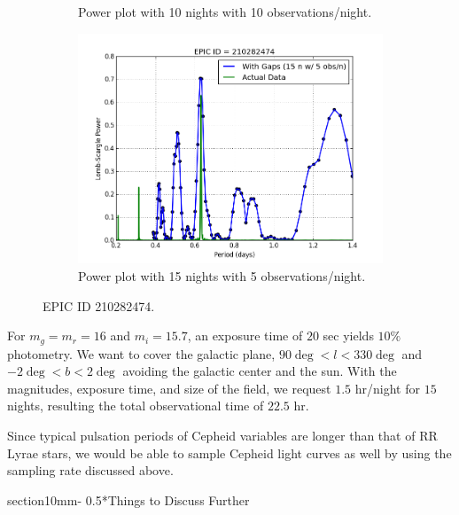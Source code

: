 \documentclass[letterpaper,11pt]{article}
\makeatletter
\renewcommand{\section}{\@startsection%
{section}{1}{0mm}{-\baselineskip}%
{0.5\baselineskip}{\normalfont\Large\bfseries}}%
\makeatother
\begin{document}
\begin{figure}[H]
\begin{subfigure}{.5\textwidth}
  \caption{Power plot with 10 nights with 10 observations/night.}
  \label{fig:1010}
  \end{subfigure}%
  \begin{subfigure}{.5\textwidth}
  \centering
  \includegraphics[width=.9\linewidth]{figures/1505Actual.png}
  \caption{Power plot with 15 nights with 5 observations/night.}
  \label{fig:1505}
\end{subfigure}
\caption{EPIC ID 210282474.}
\label{fig:EPIC}
\end{figure}

\noindent For $m_g = m_r = 16$ and $m_i = 15.7$, an exposure time of $20$ sec yields $10\%$ photometry. We want to cover the galactic plane, $90\deg < l <330\deg$ and $-2 \deg < b < 2 \deg$ avoiding the galactic center and the sun. With the magnitudes, exposure time, and size of the field, we request $1.5$ hr/night for $15$ nights, resulting the total observational time of $22.5$ hr.  


\vspace{3mm} %


\noindent Since typical pulsation periods of Cepheid variables are longer than that of RR Lyrae stars, we would be able to sample Cepheid light curves as well by using the sampling rate discussed above. 


\section*{Things to Discuss Further}
\end{document}
